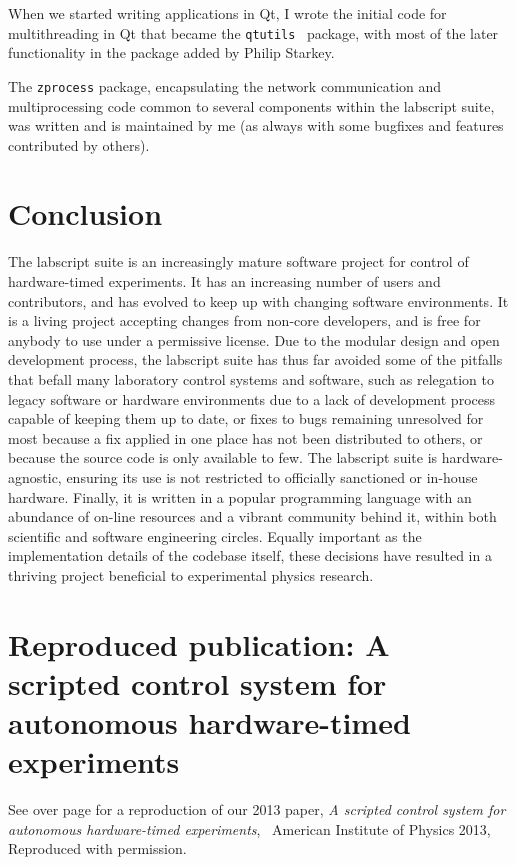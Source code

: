 When we started writing applications in Qt, I wrote the initial code for multithreading in Qt that became the \texttt{qtutils}~\cite{starkey_qtutils_2018} package, with most of the later functionality in the package added by Philip Starkey.

The \texttt{zprocess} package, encapsulating the network communication and multiprocessing code common to several components within the labscript suite, was written and is maintained by me (as always with some bugfixes and features contributed by others).

\section{Conclusion}

The labscript suite is an increasingly mature software project for control of hardware-timed experiments. It has an increasing number of users and contributors, and has evolved to keep up with changing software environments. It is a living project accepting changes from non-core developers, and is free for anybody to use under a permissive license. Due to the modular design and open development process, the labscript suite has thus far avoided some of the pitfalls that befall many laboratory control systems and software, such as relegation to legacy software or hardware environments due to a lack of development process capable of keeping them up to date, or fixes to bugs remaining unresolved for most because a fix applied in one place has not been distributed to others, or because the source code is only available to few. The labscript suite is hardware-agnostic, ensuring its use is not restricted to officially sanctioned or in-house hardware. Finally, it is written in a popular programming language with an abundance of on-line resources and a vibrant community behind it, within both scientific and software engineering circles. Equally important as the implementation details of the codebase itself, these decisions have resulted in a thriving project beneficial to experimental physics research.

\section{Reproduced publication: A scripted control system for autonomous hardware-timed experiments}

See over page for a reproduction of our 2013 paper, \emph{A scripted control system for autonomous hardware-timed experiments}, \textcopyright\ American Institute of Physics 2013, Reproduced with permission.



